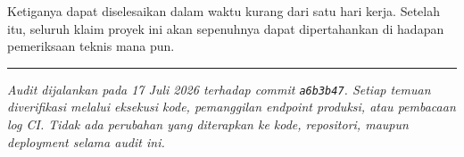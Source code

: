 \documentclass[11pt,a4paper]{article}
\newcommand{\code}[1]{\texttt{\small #1}}
\begin{document}
Ketiganya dapat diselesaikan dalam waktu kurang dari satu hari kerja. Setelah itu, seluruh klaim
proyek ini akan sepenuhnya dapat dipertahankan di hadapan pemeriksaan teknis mana pun.

\vspace{1.5em}
\hrule
\vspace{0.6em}
\noindent\small\textit{Audit dijalankan pada 17 Juli 2026 terhadap commit \code{a6b3b47}. Setiap
temuan diverifikasi melalui eksekusi kode, pemanggilan endpoint produksi, atau pembacaan log CI.
Tidak ada perubahan yang diterapkan ke kode, repositori, maupun deployment selama audit ini.}
\end{document}

